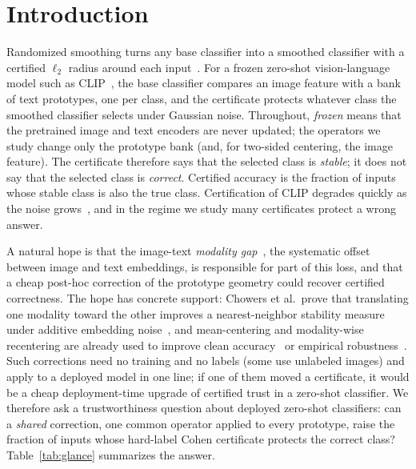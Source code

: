 \section{Introduction}
\label{sec:intro}

Randomized smoothing turns any base classifier into a smoothed classifier with a
certified $\ell_2$ radius around each input~\cite{cohen2019smoothing}. For a
frozen zero-shot vision-language model such as CLIP~\cite{radford2021clip}, the
base classifier compares an image feature with a bank of text prototypes, one
per class, and the certificate protects whatever class the smoothed classifier
selects under Gaussian noise. Throughout, \emph{frozen} means that the
pretrained image and text encoders are never updated; the operators we study
change only the prototype bank (and, for two-sided centering, the image
feature). The certificate therefore says that the selected
class is \emph{stable}; it does not say that the selected class is
\emph{correct}. Certified accuracy is the fraction of inputs whose stable class
is also the true class. Certification of CLIP degrades quickly as the noise
grows~\cite{nirala2024ovc}, and in the regime we study many certificates
protect a wrong answer.

A natural hope is that the image-text \emph{modality gap}~\cite{liang2022mind},
the systematic offset between image and text embeddings, is responsible for part
of this loss, and that a cheap post-hoc correction of the prototype geometry
could recover certified correctness. The hope has concrete support: Chowers et
al.\ prove that translating one modality toward the other improves a
nearest-neighbor stability measure under additive embedding
noise~\cite{chowers2026bug}, and mean-centering and modality-wise recentering are
already used to improve clean accuracy~\cite{li2025closing} or empirical
robustness~\cite{dong2025stabilizing,zhu2025cola}. Such corrections need no
training and no labels (some use unlabeled images) and apply to a
deployed model in one line; if one of them moved a certificate, it would be a
cheap deployment-time upgrade of certified trust in a zero-shot classifier. We therefore ask a trustworthiness question about deployed
zero-shot classifiers: can a \emph{shared} correction, one common operator
applied to every prototype, raise the fraction of inputs whose hard-label Cohen
certificate protects the correct class? Table~\ref{tab:glance} summarizes the
answer.




